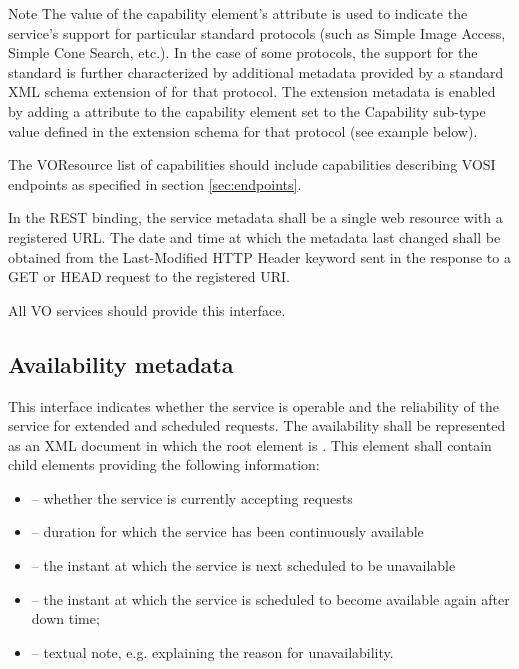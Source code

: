 \documentclass[11pt,letter]{ivoa}
\begin{document}
\begin{admonition}{Note}
The value of the capability element's  attribute is
used to indicate the service's support for particular standard protocols
(such as Simple Image Access, Simple Cone Search, etc.). In the case of
some protocols, the support for the standard is further characterized by
additional metadata provided by a standard XML schema extension of
 for that protocol. The extension metadata is enabled
by adding a  attribute to the capability element set to
the Capability sub-type value defined in the extension schema for that
protocol (see example below). 
    
The VOResource list of capabilities should include capabilities
describing VOSI endpoints as specified in section \ref{sec:endpoints}.
\end{admonition}

In the REST binding, the service metadata shall be a single web resource
with a registered URL. The date and time at which the metadata last
changed shall be obtained from the Last-Modified HTTP Header keyword
sent in the response to a GET or HEAD request to the registered URI.

All VO services should provide this interface. 

\subsection{Availability metadata}

This interface indicates whether the service is operable and the
reliability of the service for extended and scheduled requests. The
availability shall be represented as an XML document in which the root
element is
. This
element shall contain child elements providing the following
information:

\begin{itemize}
\item {} -- whether the service is currently accepting requests
\item {} -- duration for which the service has been
continuously available
\item {} -- the instant at which the service is next
scheduled to be unavailable
\item {} -- the instant at which the service is scheduled to
become available again after down time;
\item {} -- textual note, e.g. explaining the reason for unavailability. 
\end{itemize}
\end{document}
